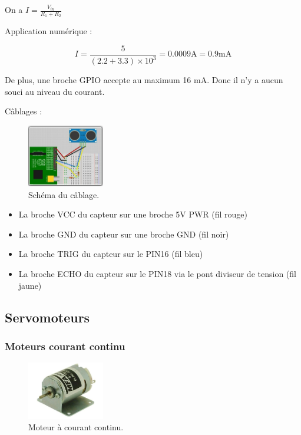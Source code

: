 \documentclass[a4paper,12pt]{report}  %
\begin{document}
On a $I = \frac{V_{in}}{R_1 + R_2}$ 

Application numérique : 

$$I = \frac{5}{(2.2+3.3)\times10^3} = 0.0009 \mathrm{A} = 0.9 \mathrm{mA}$$

De plus, une broche GPIO accepte au maximum 16 mA. Donc il n’y a aucun souci au niveau du courant. 

Câblages : 

\begin{figure}[H]
	\centering
	\includegraphics[width=0.3\textwidth]{./attachments/capteur_ultrason_rpi.jpg}
	\caption{Schéma du câblage.}
	
\end{figure}

\begin{itemize}
	\item La broche VCC du capteur sur une broche 5V PWR (fil rouge)
	\item La broche GND du capteur sur une broche GND (fil noir)
	\item La broche TRIG du capteur sur le PIN16 (fil bleu)
	\item La broche ECHO du capteur sur le PIN18 via le pont diviseur de tension (fil jaune) 
\end{itemize}

\subsection{Servomoteurs}
\subsubsection{Moteurs courant continu}
\begin{figure}[H]
	\centering
	\includegraphics[width=0.3\textwidth]{./attachments/moteur_continu.jpg}
	\caption{Moteur à courant continu.}
	
\end{figure}
\end{document}

